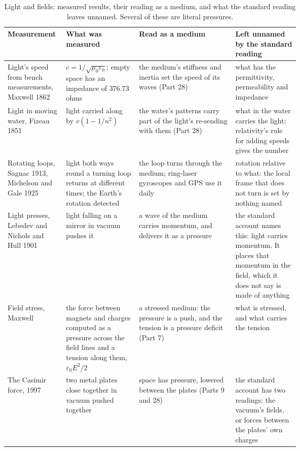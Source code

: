 \begin{table}[p]\centering\footnotesize
\caption{Light and fields: measured results, their reading as a medium, and what the standard reading leaves unnamed. Several of these are literal pressures.}
\renewcommand{\arraystretch}{1.08}\begin{tabularx}{\linewidth}{@{}>{\raggedright\arraybackslash}p{0.2\linewidth} >{\raggedright\arraybackslash}p{0.25\linewidth} >{\raggedright\arraybackslash}X >{\raggedright\arraybackslash}p{0.22\linewidth}@{}}\toprule
\textbf{Measurement} & \textbf{What was measured} & \textbf{Read as a medium} & \textbf{Left unnamed by the standard reading}\\\midrule
Light's speed from bench measurements, Maxwell 1862 & $c=1/\sqrt{\mu_0\varepsilon_0}$; empty space has an impedance of 376.73 ohms & the medium's stiffness and inertia set the speed of its waves (Part 28) & what has the permittivity, permeability and impedance\\
Light in moving water, Fizeau 1851 & light carried along by $v(1-1/n^2)$ & the water's patterns carry part of the light's re-sending with them (Part 28) & what in the water carries the light; relativity's rule for adding speeds gives the number\\
Rotating loops, Sagnac 1913, Michelson and Gale 1925 & light both ways round a turning loop returns at different times; the Earth's rotation detected & the loop turns through the medium; ring-laser gyroscopes and GPS use it daily & rotation relative to what: the local frame that does not turn is set by nothing named\\
Light presses, Lebedev and Nichols and Hull 1901 & light falling on a mirror in vacuum pushes it & a wave of the medium carries momentum, and delivers it as a pressure & the standard account names this: light carries momentum. It places that momentum in the field, which it does not say is made of anything\\
Field stress, Maxwell & the force between magnets and charges computed as a pressure across the field lines and a tension along them, $\varepsilon_0E^2/2$ & a stressed medium: the pressure is a push, and the tension is a pressure deficit (Part 7) & what is stressed, and what carries the tension\\
The Casimir force, 1997 & two metal plates close together in vacuum pushed together & space has pressure, lowered between the plates (Parts 9 and 28) & the standard account has two readings: the vacuum's fields, or forces between the plates' own charges\\

\end{tabularx}
\end{table}
